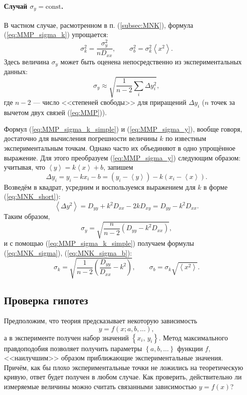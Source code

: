 \documentclass[10pt]{article}
\begin{document}
\paragraph{Случай $\sigma_{y}=\mathrm{const}$.}

В частном случае, расмотренном в п. (\ref{subsec:MNK}),
формула (\ref{eq:MMP_sigma_k}) упрощается:
\begin{equation}
\boxed{\sigma_{k}^{2}=\frac{\sigma_{y}^{2}}{nD_{xx}},\qquad\sigma_{b}^{2}=\sigma_{k}^{2}\left\langle x^{2}\right\rangle }.\label{eq:MMP_sigma_k_simple}
\end{equation}
Здесь величина $\sigma_{y}$ может быть оценена непосредственно из
экспериментальных данных:
\begin{equation}
\sigma_{y}\approx\sqrt{\frac{1}{n-2}\sum_{i}\Delta y_{i}^{2}},\label{eq:MMP_sigma_y}
\end{equation}
где $n-2$ --- число <<степеней свободы>>
для приращений $\Delta y_{i}$ ($n$ точек за вычетом двух связей
(\ref{eq:MMP})).

Формул (\ref{eq:MMP_sigma_k_simple}) и (\ref{eq:MMP_sigma_y}),
вообще говоря, достаточно для вычисления погрешности величины $k$
по известным экспериментальным точкам. Однако часто их объединяют
в одно упрощённое выражение. Для этого преобразуем (\ref{eq:MMP_sigma_y})
следующим образом: учитывая, что $\left\langle y\right\rangle =k\left\langle x\right\rangle +b$,
запишем 
\[
\Delta y_{i}=y_{i}-kx_{i}-b=\left(y_{i}-\left\langle y\right\rangle \right)-k\left(x_{i}-\left\langle x\right\rangle \right).
\]
Возведём в квадрат, усредним и воспользуемся выражением для $k$ в
форме (\ref{eq:MNK_short}):
\[
\left\langle \Delta y^{2}\right\rangle =D_{yy}+k^{2}D_{xx}-2kD_{xy}=D_{yy}-k^{2}D_{xx}.
\]
Таким образом, 
\[
\sigma_{y}=\sqrt{\frac{n}{n-2}\left(D_{yy}-k^{2}D_{xx}\right)},
\]
и с помощью (\ref{eq:MMP_sigma_k_simple}) получаем формулы (\ref{eq:MNK_sigma}),
(\ref{eq:MNK_sigma_b}):
\[
\boxed{\sigma_{k}=\sqrt{\frac{1}{n-2}\left(\frac{D_{yy}}{D_{xx}}-k^{2}\right)},\qquad\sigma_{b}=\sigma_{k}\sqrt{\left\langle x^{2}\right\rangle }}.
\]

\subsection{{\small{}Проверка гипотез}}

Предположим, что теория предсказывает некоторую зависимость
\[
y=f\!\left(x;a,b,\ldots\right),
\]
а в эксперименте получен набор значений $\left\{ x_{i},\,y_{i}\right\} $.
Метод максимального правдоподобия позволяет получить параметры $\left\{ a,b,\ldots\right\} $
функции $f$, <<наилучшим>> образом приближающие
экспериментальные значения. Причём, как бы плохо экспериментальные
точки не ложились на теоретическую кривую, ответ будет получен в любом
случае. Как проверить, действительно ли измеряемые величины можно
считать связанными зависимостью $y=f\!\left(x\right)$?
\end{document}
